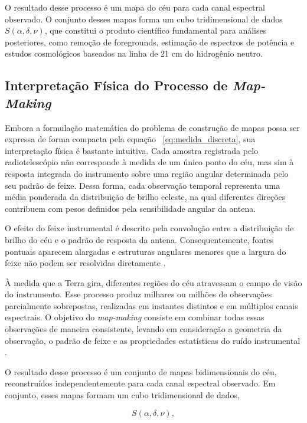 O resultado desse processo é um mapa do céu para cada canal espectral observado. O conjunto desses mapas forma um cubo tridimensional de dados \(S(\alpha,\delta,\nu)\), que constitui o produto científico fundamental para análises posteriores, como remoção de foregrounds, estimação de espectros de potência e estudos cosmológicos baseados na linha de 21 cm do hidrogênio neutro.

\subsection{Interpretação Física do Processo de \textit{Map-Making}}

Embora a formulação matemática do problema de construção de mapas possa ser expressa de forma compacta pela equação ~\ref{eq:medida_discreta}, sua interpretação física é bastante intuitiva. Cada amostra registrada pelo radiotelescópio não corresponde à medida de um único ponto do céu, mas sim à resposta integrada do instrumento sobre uma região angular determinada pelo seu padrão de feixe. Dessa forma, cada observação temporal representa uma média ponderada da distribuição de brilho celeste, na qual diferentes direções contribuem com pesos definidos pela sensibilidade angular da antena.

O efeito do feixe instrumental é descrito pela convolução entre a distribuição de brilho do céu e o padrão de resposta da antena. Consequentemente, fontes pontuais aparecem alargadas e estruturas angulares menores que a largura do feixe não podem ser resolvidas diretamente \cite{wilson2013tools,tegmark1997mapmaking}.

À medida que a Terra gira, diferentes regiões do céu atravessam o campo de visão do instrumento. Esse processo produz milhares ou milhões de observações parcialmente sobrepostas, realizadas em instantes distintos e em múltiplos canais espectrais. O objetivo do \textit{map-making} consiste em combinar todas essas observações de maneira consistente, levando em consideração a geometria da observação, o padrão de feixe e as propriedades estatísticas do ruído instrumental \cite{delabrouille2013psm}.

O resultado desse processo é um conjunto de mapas bidimensionais do céu, reconstruídos independentemente para cada canal espectral observado. Em conjunto, esses mapas formam um cubo tridimensional de dados,

\begin{equation}
S(\alpha,\delta,\nu),
\end{equation}

